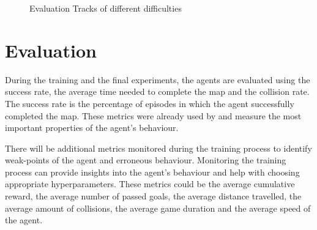 \begin{figure}
    \centering
    \qquad
    \qquad
    \qquad
    \caption{Evaluation Tracks of different difficulties}
    \label{fig:3tracks}
\end{figure}

\section{Evaluation}

During the training and the final experiments, the agents are evaluated using the success rate, the average time needed to complete the map and the collision rate. The success rate is the percentage of episodes in which the agent successfully completed the map. These metrics were already used by \autocite{maximilian} and measure the most important properties of the agent's behaviour.

There will be additional metrics monitored during the training process to identify weak-points of the agent and erroneous behaviour. Monitoring the training process can provide insights into the agent's behaviour and help with choosing appropriate hyperparameters.
These metrics could be the average cumulative reward, the average number of passed goals, the average distance travelled, the average amount of collisions, the average game duration and the average speed of the agent.


